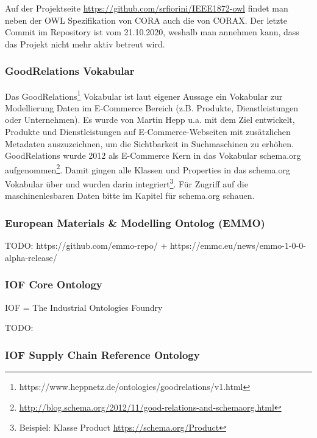\documentclass{article}
\begin{document}
Auf der Projektseite \url{https://github.com/srfiorini/IEEE1872-owl} findet man neben der OWL Spezifikation von CORA auch die von CORAX. Der letzte Commit im Repository ist vom 21.10.2020, weshalb man annehmen kann, dass das Projekt nicht mehr aktiv betreut wird.

\subsubsection{GoodRelations Vokabular}

Das GoodRelations\footnote{https://www.heppnetz.de/ontologies/goodrelations/v1.html} Vokabular ist laut eigener Aussage ein Vokabular zur Modellierung Daten im E-Commerce Bereich (z.B. Produkte, Dienstleistungen oder Unternehmen).
Es wurde von Martin Hepp u.a. mit dem Ziel entwickelt, Produkte und Dienstleistungen auf E-Commerce-Webseiten mit zusätzlichen Metadaten auszuzeichnen, um die Sichtbarkeit in Suchmaschinen zu erhöhen.
GoodRelations wurde 2012 als E-Commerce Kern in das Vokabular schema.org aufgenommen\footnote{\url{http://blog.schema.org/2012/11/good-relations-and-schemaorg.html}}.
Damit gingen alle Klassen und Properties in das schema.org Vokabular über und wurden darin integriert\footnote{Beispiel: Klasse Product \url{https://schema.org/Product}}.
Für Zugriff auf die maschinenlesbaren Daten bitte im Kapitel für schema.org schauen.

\subsubsection{European Materials \& Modelling Ontolog (EMMO)}

TODO: https://github.com/emmo-repo/ + https://emmc.eu/news/emmo-1-0-0-alpha-release/

\subsubsection{IOF Core Ontology}

IOF = The Industrial Ontologies Foundry

TODO: \cite{kulvatunyou2022}

\subsubsection{IOF Supply Chain Reference Ontology}
\end{document}
